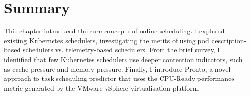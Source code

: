 %
%
%
\section{Summary}
This chapter introduced the core concepts of online scheduling. I explored
existing Kubernetes schedulers, investigating the merits of using pod
description-based schedulers vs. telemetry-based schedulers. From the brief
survey, I identified that few Kubernetes schedulers use deeper contention
indicators, such as cache pressure and memory pressure. Finally, I introduce
Pronto, a novel approach to task scheduling predictor that uses the CPU-Ready
performance metric generated by the VMware vSphere virtualisation platform.


